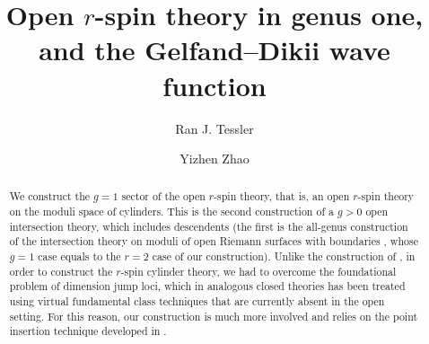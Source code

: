 \documentclass[11pt]{amsart}
\title{%
Open $r$-spin theory in genus one, and the Gelfand--Dikii wave function%
}
\date{}
\author{Ran J. Tessler \and Yizhen Zhao}
\theoremstyle{definition}
\theoremstyle{remark}
\newcommand{\<}{\left<}
\renewcommand{\>}{\right>}
\numberwithin{equation}{section}
\begin{document}
\maketitle
\begin{abstract}
We construct the $g=1$ sector of the open $r$-spin theory, that is, an open $r$-spin theory on the moduli space of cylinders. This is the second construction of a $g>0$ open intersection theory, which includes descendents (the first is %
the all-genus construction %
of the intersection theory on moduli of open Riemann surfaces with %
boundaries \cite{PST14,Tes15}, whose %
$g=1$ case equals to the $r=2$ case of our construction). Unlike the construction %
of \cite{Tes15}, in %
order to construct the $r$-spin %
cylinder theory, we %
had to overcome the foundational problem of dimension jump loci, which in analogous closed theories has been treated using virtual fundamental %
class techniques that %
are currently absent in the open setting. For %
this reason, our %
construction is much %
more involved and %
relies on the point insertion technique %
developed in \cite{TZ1,TZ2}.



\end{abstract}
\end{document}
